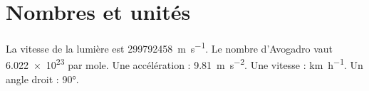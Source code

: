 \documentclass{article}
\begin{document}
\hsize=380pt
\section{Nombres et unit\'es}
La vitesse de la lumi\`ere est \SI{299792458}{\meter\per\second}.
Le nombre d'Avogadro vaut \num{6.022e23} par mole.
Une acc\'el\'eration : \SI{9.81}{\meter\per\second\squared}.
Une vitesse : \si{\kilo\meter\per\hour}. Un angle droit : \ang{90}.
\end{document}
